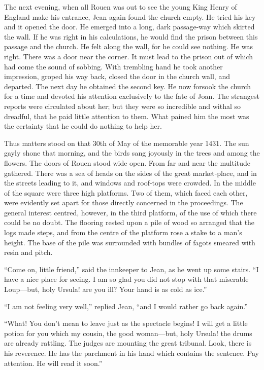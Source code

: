 The next evening, when all Rouen was out to see the young King Henry of
England make his entrance, Jean again found the church empty. He tried
his key and it opened the door. He emerged into a long, dark passage-way
which skirted the wall. If he was right in his calculations, he would
find the prison between this passage and the church. He felt along the
wall, for he could see nothing. He was right. There was a door near the
corner. It must lead to the prison out of which had come the sound of
sobbing. With trembling hand he took another impression, groped his way
back, closed the door in the church wall, and departed. The next day he
obtained the second key. He now forsook the church for a time and
devoted his attention exclusively to the fate of Joan. The strangest
reports were circulated about her; but they were so incredible and
withal so dreadful, that he paid little attention to them. What pained
him the most was the certainty that he could do nothing to help her.

Thus matters stood on that 30th of May of the memorable year 1431. The
sun gayly shone that morning, and the birds sang joyously in the trees
and among the flowers. The doors of Rouen stood wide open. From far and
near the multitude gathered. There was a sea of heads on the sides of
the great market-place, and in the streets leading to it, and windows
and roof-tops were crowded. In the middle of the square were three high
platforms. Two of them, which faced each other, were evidently set apart
for those directly concerned in the proceedings. The general interest
centred, however, in the third platform, of the use of which there could
be no doubt. The flooring rested upon a pile of wood so arranged that
the logs made steps, and from the centre of the platform rose a stake to
a man's height. The base of the pile was surrounded with bundles of
fagots smeared with resin and pitch.

``Come on, little friend,'' said the innkeeper to Jean, as he went up
some stairs. ``I have a nice place for seeing. I am so glad you did not
stop with that miserable Loup---but, holy Ursula! are you ill? Your hand
is as cold as ice.''

``I am not feeling very well,'' replied Jean, ``and I would rather go
back again.''

``What! You don't mean to leave just as the spectacle begins! I will get
a little potion for you which my cousin, the good woman---but, holy
Ursula! the drums are already rattling. The judges are mounting the
great tribunal. Look, there is his reverence. He has the parchment in
his hand which contains the sentence. Pay attention. He will read it
soon.''

